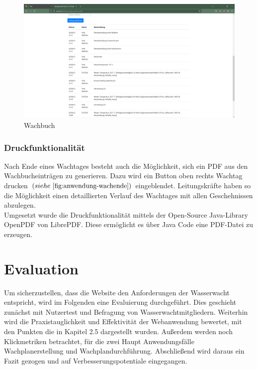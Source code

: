 \documentclass[fontsize=12pt,openright,oneside,paper=a4,BCOR=1cm]{scrbook}
\begin{document}
\begin{figure}[H]
  \centering
    \includegraphics[width=0.7\linewidth]{Anlagen/Anwendung/8-6WachtagWachbuchLog.png}
    \caption{Wachbuch}
  \label{fig:anwendung-wachbuch}
\end{figure}


\subsection{Druckfunktionalität}

Nach Ende eines Wachtages besteht auch die M\"oglichkeit, sich ein PDF aus den Wachbucheintr\"agen zu generieren. Dazu wird ein Button oben rechts \glqq Wachtag drucken\grqq{} $(siehe~\ref{fig:anwendung-wachende})$ eingeblendet. Leitungskr\"afte haben so die M\"oglichkeit einen detaillierten Verlauf des Wachtages mit allen Geschehnissen abzulegen. \\
Umgesetzt wurde die Druckfunktionalit\"at mittels der Open-Source Java-Library OpenPDF von LibrePDF. Diese erm\"oglicht es \"uber Java Code eine PDF-Datei zu erzeugen.\\



%
%

\chapter{Evaluation}

Um sicherzustellen, dass die Website den Anforderungen der Wasserwacht entspricht, wird im Folgenden eine Evaluierung durchgeführt. Dies geschieht zunächst mit Nutzertest und Befragung von Wasserwachtmitgliedern. Weiterhin wird die Praxistauglichkeit und Effektivität der Webanwendung bewertet, mit den Punkten die in Kapitel 2.5 dargestellt wurden. Außerdem werden noch \glqq Klickmetriken\grqq{} betrachtet, für die zwei Haupt Anwendungsfälle Wachplanerstellung und Wachplandurchführung. Abschließend wird daraus ein Fazit gezogen und auf Verbesserungspotentiale eingegangen. 
\end{document}
